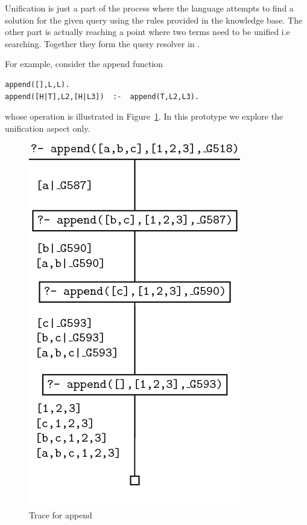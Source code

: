 \documentclass[thesis-solanki.tex]{subfiles}
\begin{document}
Unification is just a part of the process where the language
attempts to find a solution for the given query using the rules provided
in the knowledge base.
The other part is actually reaching a point where two terms need to be
unified i.e searching.
Together they form the query resolver in .

For example, consider the append function
\par
\begin{verbatim}
append([],L,L).
append([H|T],L2,[H|L3])  :-  append(T,L2,L3).
\end{verbatim}
%
whose operation is illustrated in Figure~\ref{fig:Trace for append}.
In this prototype we explore the unification aspect only.



\begin{figure}
\centering
\includegraphics[scale = 0.5]{PrologAppendWorking.png}
\caption{Trace for append \cite{webiste:learnprolognowappend}}
\label{fig:Trace for append}
\end{figure}
\end{document}
